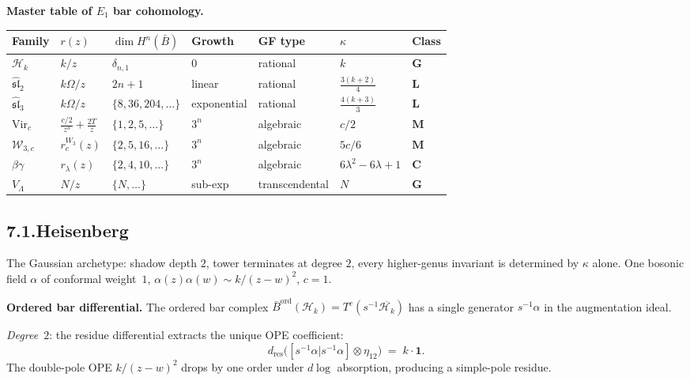 \documentclass[11pt,reqno]{amsart}
\theoremstyle{definition}
\theoremstyle{remark}
\providecommand{\cH}{\mathcal{H}}
\providecommand{\cW}{\mathcal{W}}
\providecommand{\barB}{\bar{B}}
\providecommand{\Vir}{\mathrm{Vir}}
\numberwithin{equation}{section}
\begin{document}
\medskip
\noindent\textbf{Master table of $E_1$ bar cohomology.}\enspace
\begin{center}
\small
\renewcommand{\arraystretch}{1.2}
\begin{tabular}{lllllll}
\textbf{Family} & $r(z)$ & $\dim H^n(\barB)$
 & \textbf{Growth} & \textbf{GF type}
 & $\kappa$ & \textbf{Class}\\ \hline
$\cH_k$ & $k/z$ & $\delta_{n,1}$
 & $0$ & rational & $k$ & $\mathbf G$\\
$\widehat{\mathfrak{sl}}_2$ & $k\Omega/z$ & $2n{+}1$
 & linear & rational & $\frac{3(k{+}2)}{4}$ & $\mathbf L$\\
$\widehat{\mathfrak{sl}}_3$ & $k\Omega/z$ & $\{8,36,204,\ldots\}$
 & exponential & rational & $\frac{4(k{+}3)}{3}$ & $\mathbf L$\\
$\Vir_c$ & $\frac{c/2}{z^3}{+}\frac{2T}{z}$ & $\{1,2,5,\ldots\}$
 & $3^n$ & algebraic & $c/2$ & $\mathbf M$\\
$\cW_{3,c}$ & $r_c^{W_3}(z)$ & $\{2,5,16,\ldots\}$
 & $3^n$ & algebraic & $5c/6$ & $\mathbf M$\\
$\beta\gamma$ & $r_\lambda(z)$ & $\{2,4,10,\ldots\}$
 & $3^n$ & algebraic & $6\lambda^2{-}6\lambda{+}1$ & $\mathbf C$\\
$V_\Lambda$ & $N/z$ & $\{N,\ldots\}$
 & sub-exp & transcendental & $N$ & $\mathbf G$
\end{tabular}
\end{center}

\subsection*{7.1.\quad Heisenberg}

The Gaussian archetype: shadow depth $2$, tower terminates at
degree $2$, every higher-genus invariant is determined by $\kappa$
alone. One bosonic field $\alpha$ of conformal weight~$1$,
$\alpha(z)\alpha(w)\sim k/(z-w)^2$, $c=1$.

\medskip\noindent\textbf{Ordered bar differential.}\enspace
The ordered bar complex
$\barB^{\mathrm{ord}}(\cH_k)=T^c(s^{-1}\overline{\cH_k})$
has a single generator $s^{-1}\alpha$ in the augmentation ideal.

\emph{Degree~$2$}: the residue differential extracts the unique
OPE coefficient:
\[
d_{\mathrm{res}}\bigl([s^{-1}\alpha|s^{-1}\alpha]
\otimes\eta_{12}\bigr)
\;=\;k\cdot\mathbf{1}.
\]
The double-pole OPE $k/(z-w)^2$ drops by one order under $d\log$
absorption, producing a simple-pole residue.
\end{document}
